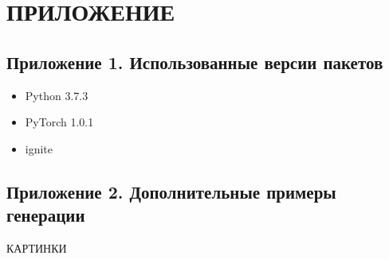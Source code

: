 \clearpage
\section*{\hfil ПРИЛОЖЕНИЕ \hfil}
	\subsection*{Приложение 1. Использованные версии пакетов}
		\begin{itemize}
			\item Python 3.7.3
			\item PyTorch 1.0.1
			\item ignite
		\end{itemize}
	
	\subsection*{Приложение 2. Дополнительные примеры генерации}
	КАРТИНКИ